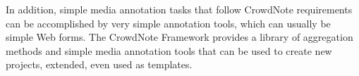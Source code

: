 In addition, simple media annotation tasks that follow CrowdNote requirements can be accomplished by very simple annotation tools, which can usually be simple Web forms. The CrowdNote Framework provides a library of aggregation methods and simple media annotation tools that can be used to create new projects, extended, even used as templates.
